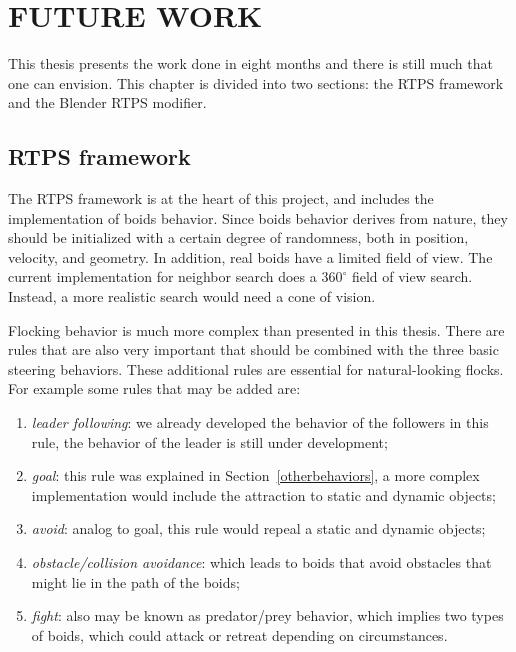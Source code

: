 \chapter{FUTURE WORK}\label{chap8}

This thesis presents the work done in eight months and there is still much that one can envision. This chapter is  divided into two sections: the RTPS framework and the Blender RTPS modifier.

\section{RTPS framework}

The RTPS framework is at the heart of this project, and includes the implementation of boids behavior. Since boids behavior derives from nature, they should be initialized with a certain degree of randomness, both in position, velocity, and geometry. In addition, real boids have a limited field of view. The current implementation for neighbor search does a $360^{\circ}$ field of view search. Instead, a more realistic search would need a cone of vision.

Flocking behavior is much more complex than presented in this thesis. There are rules that are also very important that should be combined with the three basic steering behaviors. These additional rules are essential for natural-looking flocks. For example some rules that may be added are: 

\begin{enumerate}
\item{\textit{leader following}: we already developed the behavior of the followers in this rule, the behavior of the leader  is still under development;}
\item{\textit{goal}: this rule was explained in Section~\ref{otherbehaviors}, a more complex implementation would include the attraction to static and dynamic objects;}
\item{\textit{avoid}: analog to goal, this rule would repeal a static and dynamic objects;} 
\item{\textit{obstacle/collision avoidance}: which leads to boids that avoid obstacles that might lie in the path of the boids;}
\item{\textit{fight}: also may be known as predator/prey behavior, which implies two types of boids, which could attack or retreat depending on circumstances.}
\end{enumerate}


